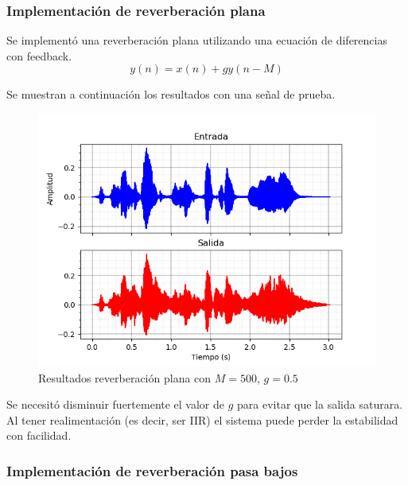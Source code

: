 \documentclass[assd_tp2_main.tex]{subfiles}
\begin{document}
\subsubsection{Implementación de reverberación plana}
Se implementó una reverberación plana utilizando una ecuación de diferencias con feedback. 
\begin{equation}
	y(n)=x(n)+gy(n-M)
\end{equation}

\newpage
Se muestran a continuación los resultados con una señal de prueba.
\begin{figure}[H]	
	\centering
	\includegraphics[scale=1]{graficos/EJ8/eco_plano.png}
	\caption{Resultados reverberación plana con $M=500$, $g=0.5$ }
	\label{fig:bloqueElemental}
\end{figure}
Se necesitó disminuir fuertemente el valor de $g$ para evitar que la salida saturara. Al tener realimentación (es decir, ser IIR) el sistema puede perder la estabilidad con facilidad.

\subsubsection{Implementación de reverberación pasa bajos}
\end{document}
